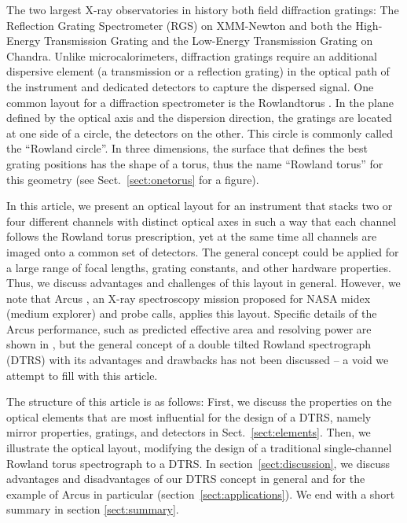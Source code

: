 \documentclass[linenumbers]{aastex631}
\begin{document}
The two largest X-ray observatories in history both field diffraction gratings: The Reflection Grating Spectrometer (RGS) on XMM-Newton \citep{2001A&A...365L...7D} and both the High-Energy Transmission Grating  \citep[HETG,][]{2005PASP..117.1144C} and the Low-Energy Transmission Grating \citep[LETG,][]{1997SPIE.3113..172P} on Chandra.
Unlike microcalorimeters, diffraction gratings require an additional dispersive element (a transmission or a reflection grating) in the optical path of the instrument and dedicated detectors to capture the dispersed signal. One common layout for a diffraction spectrometer is the Rowlandtorus \citep{Beuermann:78}. In the plane defined by the optical axis and the dispersion direction, the gratings are located at one side of a circle, the detectors on the other. This circle is commonly called the ``Rowland circle''. In three dimensions, the surface that defines the best grating positions has the shape of a torus, thus the name ``Rowland torus'' for this geometry (see Sect.~\ref{sect:onetorus} for a figure).

In this article, we present an optical layout for an instrument that stacks two or four different channels with distinct optical axes in such a way that each channel follows the Rowland torus prescription, yet at the same time all channels are imaged onto a common set of detectors. The general concept could be applied for a large range of focal lengths, grating constants, and other hardware properties. Thus, we discuss advantages and challenges of this layout in general. However, we note that Arcus \citep{2023SPIE12678E..0ES}, an X-ray spectroscopy mission proposed for NASA midex (medium explorer) and probe calls, applies this layout. Specific details of the  Arcus performance, such as predicted effective area and resolving power are shown in \citet{2018SPIE10699E..6FG,2023SPIE12678E..1DG}, but the general concept of a double tilted Rowland spectrograph (DTRS) with its advantages and drawbacks has not been discussed -- a void we attempt to fill with this article.

The structure of this article is as follows: First, we discuss the properties on the optical elements that are most influential for the design of a DTRS, namely mirror properties, gratings, and detectors in Sect.~\ref{sect:elements}. Then, we illustrate the optical layout, modifying the design of a traditional single-channel Rowland torus spectrograph to a DTRS. In section~\ref{sect:discussion}, we discuss advantages and disadvantages of our DTRS concept in general and for the example of Arcus in particular (section~\ref{sect:applications}). We end with a short summary in section \ref{sect:summary}.
\end{document}
